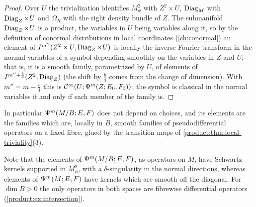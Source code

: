 \begin{proof}
Over $U$ the trivialization identifies $M^2_\phi$ with $Z^2\times U$, $\operatorname{Diag}_M$
with $\operatorname{Diag}_Z\times U$ and $\Omega_R$ with the right density bundle of $Z$. The
submanifold $\operatorname{Diag}_Z\times U$ is a product, the variables in $U$ being variables
along it, so by the definition of conormal distributions in local coordinates
(\cref{ch:conormal}) an element of $I^{m''}(Z^2\times U,\operatorname{Diag}_Z\times U)$ is
locally the inverse Fourier transform in the normal variables of a symbol
depending smoothly on the variables in $Z$ and $U$; that is, it is a smooth
family, parametrized by $U$, of elements of $I^{m''+\frac b4}(Z^2,\operatorname{Diag}_Z)$
(the shift by $\frac b4$ comes from the change of dimension). With
$m''=m-\frac b4$ this is $\mathcal{C}^\infty(U;\Psi^{m}(Z;E_0,F_0))$; the symbol is classical
in the normal variables if and only if each member of the family is.
\end{proof}

In particular $\Psi^{m}(M/B;E,F)$ does not depend on choices, and its elements are
the families which are, locally in $B$, smooth families of pseudodifferential
operators on a fixed fibre, glued by the transition maps of
\cref{product:thm:local-triviality}(3).

Note that the elements of $\Psi^{m}(M/B;E,F)$, as operators on $M$, have
Schwartz kernels supported in $M^2_\phi$, with a $\delta$-singularity in the
normal directions, whereas elements of $\Psi^{m}(M;E,F)$ have kernels which are
smooth off the diagonal. For $\dim B>0$ the only operators in both spaces are
fibrewise differential operators (\cref{product:ex:intersection}).

